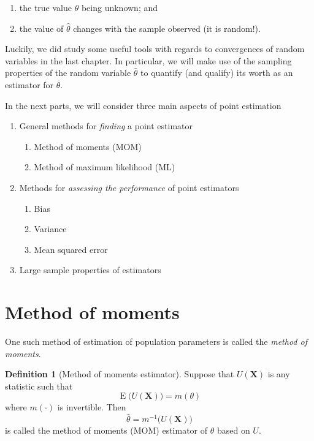 \documentclass[
]{book}
\providecommand{\tightlist}{%
  \setlength{\itemsep}{0pt}\setlength{\parskip}{0pt}}
\newcommand{\bX}{{\boldsymbol X}}
\DeclareMathOperator{\E}{E}
\theoremstyle{definition}
\newtheorem{definition}{Definition}[chapter]
\theoremstyle{definition}
\theoremstyle{definition}
\theoremstyle{definition}
\theoremstyle{remark}
\begin{document}
\begin{enumerate}
\def\labelenumi{\roman{enumi}.}
\item
  the true value \(\theta\) being unknown; and
\item
  the value of \(\hat\theta\) changes with the sample observed (it is random!).
\end{enumerate}

Luckily, we did study some useful tools with regards to convergences of random variables in the last chapter.
In particular, we will make use of the sampling properties of the random variable \(\hat\theta\) to quantify (and qualify) its worth as an estimator for \(\theta\).

In the next parts, we will consider three main aspects of point estimation

\begin{enumerate}
\def\labelenumi{\arabic{enumi}.}
\tightlist
\item
  General methods for \emph{finding} a point estimator

  \begin{enumerate}
  \def\labelenumii{\alph{enumii}.}
  \tightlist
  \item
    Method of moments (MOM)
  \item
    Method of maximum likelihood (ML)
  \end{enumerate}
\item
  Methods for \emph{assessing the performance} of point estimators

  \begin{enumerate}
  \def\labelenumii{\alph{enumii}.}
  \tightlist
  \item
    Bias
  \item
    Variance
  \item
    Mean squared error
  \end{enumerate}
\item
  Large sample properties of estimators
\end{enumerate}

\hypertarget{method-of-moments}{%
\section{Method of moments}\label{method-of-moments}}

One such method of estimation of population parameters is called the \emph{method of moments}.

\begin{definition}[Method of moments estimator]
Suppose that \(U(\bX)\) is any statistic such that
\[
  \E\big(U(\bX)\big) = m(\theta)
\]
where \(m(\cdot)\) is invertible. Then
\[
  \hat\theta = m^{-1}\big(U(\bX)\big)
\]
is called the method of moments (MOM) estimator of \(\theta\) based on \(U\).
\end{definition}
\end{document}

